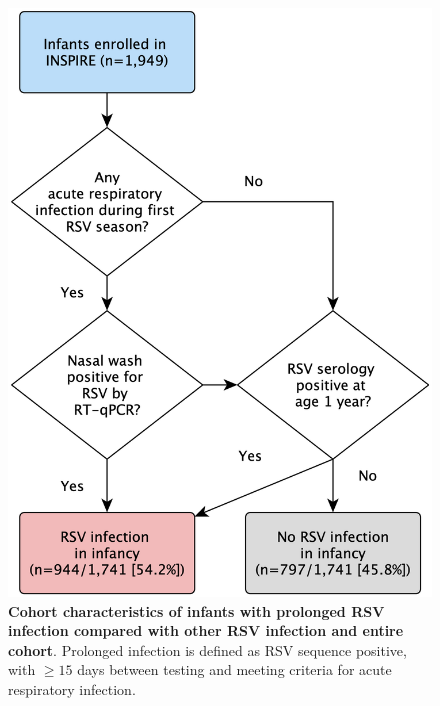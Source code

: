 \documentclass{article} %
\begin{document}
\begin{figure}[ht] \hspace*{0cm}  \begin{center}
    \includegraphics[scale=0.1]{f1_rsv_persist2022}
	\caption{\textbf{Cohort characteristics of infants with prolonged RSV infection compared with other RSV infection and entire cohort}. Prolonged infection is defined as RSV sequence positive, with $\ge 15$ days between testing and meeting criteria for acute respiratory infection.}

	\label{fig:1}
 \end{center} \end{figure}
 
\end{document}
